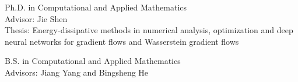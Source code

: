 Ph.D. in Computational and Applied Mathematics\\
Advisor: Jie Shen\\
Thesis: Energy-dissipative methods in numerical analysis, optimization and deep neural networks for gradient flows and Wasserstein gradient flows

\vspace{0.4em}

B.S. in Computational and Applied Mathematics\\
Advisors: Jiang Yang and Bingsheng He
